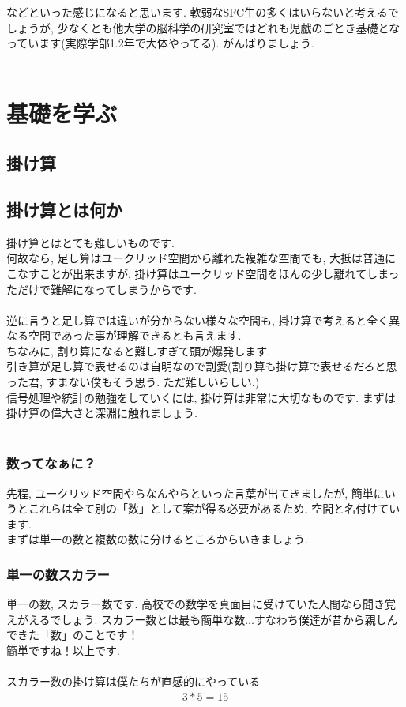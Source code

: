 \documentclass[11pt,a4paper]{jsarticle}
\begin{document}
などといった感じになると思います. 軟弱なSFC生の多くはいらないと考えるでしょうが, 少なくとも他大学の脳科学の研究室ではどれも児戯のごとき基礎となっています(実際学部1.2年で大体やってる). がんばりましょう.
\\
\\
\section{基礎を学ぶ}
\subsection{掛け算}
\subsection{掛け算とは何か}
掛け算とはとても難しいものです.\\
何故なら, 足し算はユークリッド空間から離れた複雑な空間でも, 大抵は普通にこなすことが出来ますが, 掛け算はユークリッド空間をほんの少し離れてしまっただけで難解になってしまうからです. \\
\\
逆に言うと足し算では違いが分からない様々な空間も, 掛け算で考えると全く異なる空間であった事が理解できるとも言えます. \\
ちなみに, 割り算になると難しすぎて頭が爆発します. \\
引き算が足し算で表せるのは自明なので割愛(割り算も掛け算で表せるだろと思った君, すまない僕もそう思う. ただ難しいらしい.)\\
信号処理や統計の勉強をしていくには, 掛け算は非常に大切なものです. まずは掛け算の偉大さと深淵に触れましょう.\\
\\
\subsubsection{数ってなぁに？}
先程, ユークリッド空間やらなんやらといった言葉が出てきましたが, 簡単にいうとこれらは全て別の「数」として案が得る必要があるため, 空間と名付けています.\\
まずは単一の数と複数の数に分けるところからいきましょう.\\

\subsubsection{単一の数スカラー}
単一の数, スカラー数です. 高校での数学を真面目に受けていた人間なら聞き覚えがえるでしょう. スカラー数とは最も簡単な数...すなわち僕達が昔から親しんできた「数」のことです！\\
簡単ですね！以上です.\\
\\
スカラー数の掛け算は僕たちが直感的にやっている
\begin{eqnarray}
3 * 5 = 15
\end{eqnarray}
\end{document}

